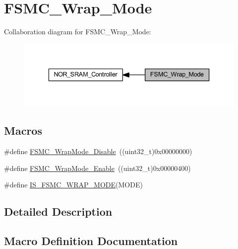 \hypertarget{group___f_s_m_c___wrap___mode}{}\section{F\+S\+M\+C\+\_\+\+Wrap\+\_\+\+Mode}
\label{group___f_s_m_c___wrap___mode}
Collaboration diagram for F\+S\+M\+C\+\_\+\+Wrap\+\_\+\+Mode\+:
\nopagebreak
\begin{figure}[H]
\begin{center}
\leavevmode
\includegraphics[width=336pt]{group___f_s_m_c___wrap___mode}
\end{center}
\end{figure}
\subsection*{Macros}
\begin{DoxyCompactItemize}
\item 
\#define \hyperlink{group___f_s_m_c___wrap___mode_ga6041f0d3055ea3811a5a19560092f266}{F\+S\+M\+C\+\_\+\+Wrap\+Mode\+\_\+\+Disable}~((uint32\+\_\+t)0x00000000)
\item 
\#define \hyperlink{group___f_s_m_c___wrap___mode_gad07eb0ae0362b2f94071d0dab6473fda}{F\+S\+M\+C\+\_\+\+Wrap\+Mode\+\_\+\+Enable}~((uint32\+\_\+t)0x00000400)
\item 
\#define \hyperlink{group___f_s_m_c___wrap___mode_ga0751d74b7fb1e17f6cedea091e8ebfc8}{I\+S\+\_\+\+F\+S\+M\+C\+\_\+\+W\+R\+A\+P\+\_\+\+M\+O\+DE}(M\+O\+DE)
\end{DoxyCompactItemize}


\subsection{Detailed Description}


\subsection{Macro Definition Documentation}
\mbox{\label{group___f_s_m_c___wrap___mode_ga6041f0d3055ea3811a5a19560092f266}} 
